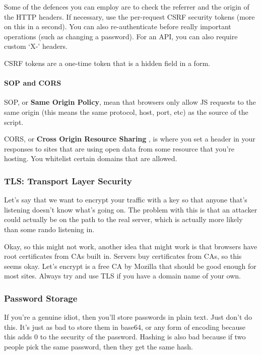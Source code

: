 \documentclass[11pt,a4paper,titlepage,dvipsnames,cmyk]{scrartcl}
\begin{document}
Some of the defences you can employ are to check the referrer and the
origin of the HTTP headers. If necessary, use the per-request CSRF
security tokens (more on this in a second). You can also re-authenticate
before really important operations (such as changing a password). For an
API, you can also require custom `X-' headers.

CSRF tokens are a one-time token that is a hidden field in a form.

\paragraph{SOP and CORS}%
\label{par:SOP and CORS}

SOP, or \textbf{Same Origin Policy}, mean that browsers only allow JS
requests to the same origin (this means the same protocol, host, port,
etc) as the source of the script.

CORS, or \textbf{Cross Origin Resource Sharing} , is where you set a
header in your responses to sites that are using open data from some
resource that you're hosting. You whitelist certain domains that are
allowed.

\subsubsection{TLS: Transport Layer Security}%
\label{ssub:TLS}

Let's say that we want to encrypt your traffic with a key so that anyone
that's listening doesn't know what's going on. The problem with this is
that an attacker could actually be on the path to the real server, which
is actually more likely than some rando listening in.

Okay, so this might not work, another idea that might work is that
browsers have root certificates from CAs built in. Servers buy
certificates from CAs, so this seems okay. Let's encrypt is a free CA by
Mozilla that should be good enough for most sites. Always try and use TLS
if you have a domain name of your own. 

\subsubsection{Password Storage}%
\label{ssub:Password Storage}
If you're a genuine idiot, then you'll store passwords in plain text. Just
don't do this. It's just as bad to store them in base64, or any form of
encoding because this adds 0 to the security of the password. Hashing is
also bad because if two people pick the same password, then they get the
same hash.
\end{document}

